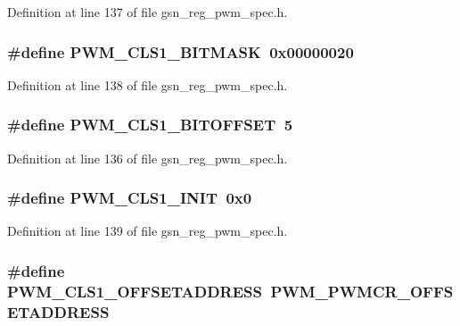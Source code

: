 Definition at line 137 of file gsn\_\-reg\_\-pwm\_\-spec.h.

\hypertarget{a00565_a25ab219a74af0d96b957e5a8247e9f6f}{
\subsubsection[{PWM\_\-CLS1\_\-BITMASK}]{\setlength{\rightskip}{0pt plus 5cm}\#define PWM\_\-CLS1\_\-BITMASK~0x00000020}}
\label{a00565_a25ab219a74af0d96b957e5a8247e9f6f}


Definition at line 138 of file gsn\_\-reg\_\-pwm\_\-spec.h.

\hypertarget{a00565_af9f76b27b56b26bb53b426e0fbf48c85}{
\subsubsection[{PWM\_\-CLS1\_\-BITOFFSET}]{\setlength{\rightskip}{0pt plus 5cm}\#define PWM\_\-CLS1\_\-BITOFFSET~5}}
\label{a00565_af9f76b27b56b26bb53b426e0fbf48c85}


Definition at line 136 of file gsn\_\-reg\_\-pwm\_\-spec.h.

\hypertarget{a00565_ab86d21e8e4c60a9168861b5d7b9544bb}{
\subsubsection[{PWM\_\-CLS1\_\-INIT}]{\setlength{\rightskip}{0pt plus 5cm}\#define PWM\_\-CLS1\_\-INIT~0x0}}
\label{a00565_ab86d21e8e4c60a9168861b5d7b9544bb}


Definition at line 139 of file gsn\_\-reg\_\-pwm\_\-spec.h.

\hypertarget{a00565_a746ef691be8e0fcde7ccc848780ca9e0}{
\subsubsection[{PWM\_\-CLS1\_\-OFFSETADDRESS}]{\setlength{\rightskip}{0pt plus 5cm}\#define PWM\_\-CLS1\_\-OFFSETADDRESS~PWM\_\-PWMCR\_\-OFFSETADDRESS}}
\label{a00565_a746ef691be8e0fcde7ccc848780ca9e0}


